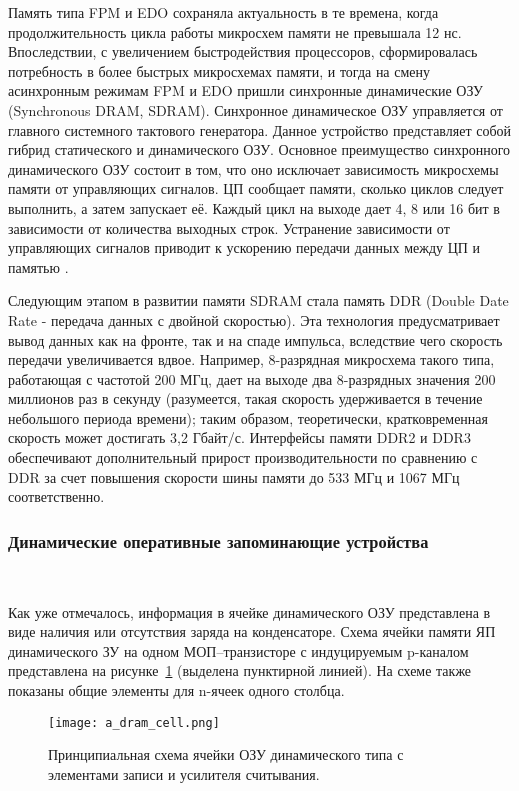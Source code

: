 Память типа FPM и EDO сохраняла актуальность в те времена, когда продолжительность цикла работы микросхем памяти не превышала 12 нс. Впоследствии, с увеличением быстродействия процессоров, сформировалась потребность в более быстрых микросхемах памяти, и тогда на смену асинхронным режимам FPM и EDO пришли синхронные динамические ОЗУ (Synchronous DRAM, SDRAM). Синхронное динамическое ОЗУ управляется от главного системного тактового генератора. Данное устройство представляет собой гибрид статического и динамического ОЗУ. Основное преимущество синхронного динамического ОЗУ состоит в том, что оно исключает зависимость микросхемы памяти от управляющих сигналов. ЦП сообщает памяти, сколько циклов следует выполнить, а затем запускает её. Каждый цикл на выходе дает 4, 8 или 16 бит в зависимости от количества выходных строк. Устранение зависимости от управляющих сигналов приводит к ускорению передачи данных между ЦП и памятью \cite{ibm_dram_article}.

Следующим этапом в развитии памяти SDRAM стала память DDR (Double Date Rate - передача данных с двойной скоростью). Эта технология предусматривает вывод данных как на фронте, так и на спаде импульса, вследствие чего скорость передачи увеличивается вдвое. Например, 8-разрядная микросхема такого типа, работающая с частотой 200 МГц, дает на выходе два 8-разрядных значения 200 миллионов раз в секунду (разумеется, такая скорость удерживается в течение небольшого периода времени); таким образом, теоретически, кратковременная скорость может достигать 3,2 Гбайт/с. Интерфейсы памяти DDR2 и DDR3 обеспечивают дополнительный прирост производительности по сравнению с DDR за счет повышения скорости шины памяти до 533 МГц и 1067 МГц соответственно.

\subsubsection{Динамические оперативные запоминающие устройства}~\\
\label{page:domain:ram:dram}

Как уже отмечалось, информация в ячейке динамического ОЗУ представлена в виде наличия или отсутствия заряда на конденсаторе. Схема ячейки памяти ЯП динамического ЗУ на одном МОП–транзисторе с индуцируемым p-каналом представлена на рисунке~\ref{fig:domain:ram:dram:dram_cell} (выделена пунктирной линией). На схеме также показаны общие элементы для n-ячеек одного столбца. 


\begin{figure}[ht]
\centering
  \texttt{[image: a\_dram\_cell.png]}  
  \caption{ Принципиальная схема ячейки ОЗУ динамического типа с элементами записи и усилителя считывания. }
  \label{fig:domain:ram:dram:dram_cell}
\end{figure}

